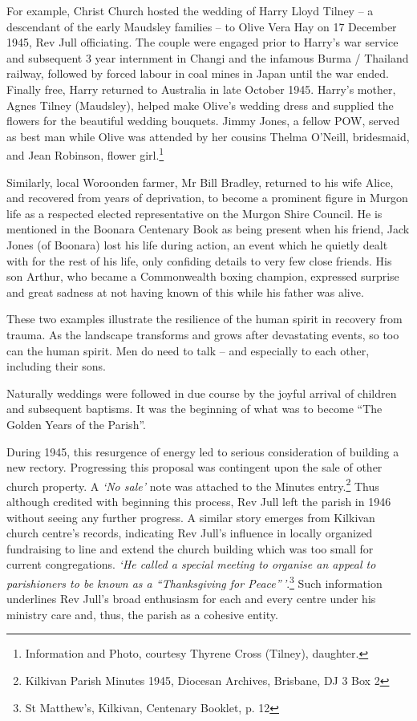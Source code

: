 For example, Christ Church hosted the wedding of Harry Lloyd Tilney -- a descendant of the early Maudsley families -- to Olive Vera Hay on 17 December 1945, Rev Jull officiating. The couple were engaged prior to Harry's war service and subsequent 3  year internment in Changi and the infamous Burma / Thailand railway, followed by forced labour in coal mines in Japan until the war ended. Finally free, Harry returned to Australia in late October 1945. Harry's mother, Agnes Tilney (Maudsley), helped make Olive's wedding dress and supplied the flowers for the beautiful wedding bouquets. Jimmy Jones, a fellow POW, served as best man while Olive was attended by her cousins Thelma O'Neill, bridesmaid, and Jean Robinson, flower girl.\footnote{Information and Photo, courtesy Thyrene Cross (Tilney), daughter.}


Similarly, local Woroonden farmer, Mr Bill Bradley, returned to his wife Alice, and recovered from years of deprivation, to become a prominent figure in Murgon life as a respected elected representative on the Murgon Shire Council. He is mentioned in the Boonara Centenary Book as being present when his friend, Jack Jones (of Boonara) lost his life during action, an event which he quietly dealt with for the rest of his life, only confiding details to very few close friends. His son Arthur, who became a Commonwealth boxing champion, expressed surprise and great sadness at not having known of this while his father was alive.



These two examples illustrate the resilience of the human spirit in recovery from trauma. As the landscape transforms and grows after devastating events, so too can the human spirit. Men do need to talk -- and especially to each other, including their sons.



Naturally weddings were followed in due course by the joyful arrival of children and subsequent baptisms. It was the beginning of what was to become ``The Golden Years of the Parish''.



During 1945, this resurgence of energy led to serious consideration of building a new rectory. Progressing this proposal was contingent upon the sale of other church property. A \emph{`No sale'} note was attached to the Minutes entry.\footnote{Kilkivan Parish Minutes 1945, Diocesan Archives, Brisbane, DJ 3 Box 2} Thus although credited with beginning this process, Rev Jull left the parish in 1946 without seeing any further progress. A similar story emerges from Kilkivan church centre's records, indicating Rev Jull's influence in locally organized fundraising to line and extend the church building which was too small for current congregations. \emph{`He called a special meeting to organise an appeal to parishioners to be known as a ``Thanksgiving for Peace''\,'}.\footnote{St Matthew's, Kilkivan, Centenary Booklet, p. 12} Such information underlines Rev Jull's broad enthusiasm for each and every centre under his ministry care and, thus, the parish as a cohesive entity.


